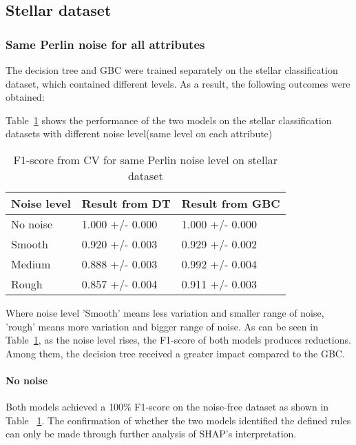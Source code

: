 \documentclass[runningheads,a4paper]{llncs}
\begin{document}
\subsection{Stellar dataset}

\subsubsection{Same Perlin noise for all attributes}

The decision tree and GBC were trained separately on the stellar classification dataset, which contained different levels. As a result, the following outcomes were obtained:

Table~\ref{result from same stellar perlin} shows the performance of the two models on the stellar classification datasets with different noise level(same level on each attribute)

\begin{table}[H]
	\centering
	\caption{F1-score from CV for same Perlin noise level on stellar dataset}
	\label{result from same stellar perlin}
	\begin{tabular}{|l|l|l|}
		\hline
		Noise level & Result from DT  &Result from GBC\\
		\hline
		No noise& 1.000 +/- 0.000& 1.000 +/- 0.000 \\
		Smooth & 0.920 +/- 0.003 & 0.929 +/- 0.002 \\
		Medium & 0.888 +/- 0.003 & 0.992 +/- 0.004 \\
		Rough & 0.857 +/- 0.004 & 0.911 +/- 0.003 \\
		\hline
	\end{tabular}
\end{table}
Where noise level 'Smooth' means less variation and smaller range  of noise, 'rough' means more variation and bigger range of noise.
As can be seen in Table~\ref{result from same stellar perlin}, as the noise level rises, the F1-score of both models produces reductions. Among them, the decision tree received a greater impact compared to the GBC.

\paragraph{No noise}
Both models achieved a 100\% F1-score on the noise-free dataset as shown in Table ~\ref{result from same stellar perlin}. The confirmation of whether the two models identified the defined rules can only be made through further analysis of SHAP's interpretation.
\end{document}
